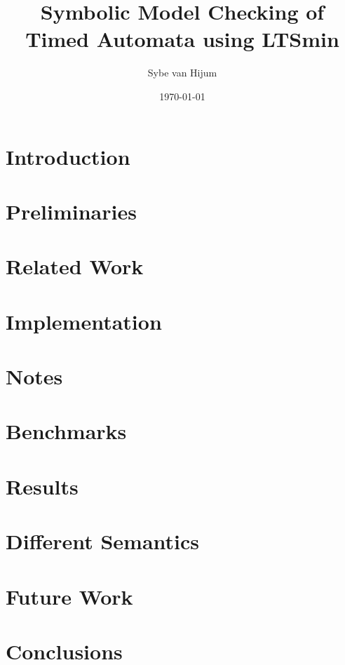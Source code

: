 \documentclass[11pt,a4paper]{article}
\newcommand{\ltsmin}{LTSmin}
\begin{document}
\newtheorem{mydef}{Definition}
\newtheorem{myconjecture}{Conjecture}
\title{Symbolic Model Checking of Timed Automata using \ltsmin{}}
\author{Sybe van Hijum}
\date{\today{}}
\maketitle

\clearpage
\tableofcontents

\clearpage
\section{Introduction}


%

\clearpage
\section{Preliminaries}


\clearpage
\section{Related Work}


\clearpage
\section{Implementation}


%

\clearpage
\section{Notes}


\clearpage
\section{Benchmarks}


\clearpage
\section{Results}


\clearpage
\section{Different Semantics}


\clearpage
\section{Future Work}


\clearpage
\section{Conclusions}


\clearpage
{}

\end{document}
